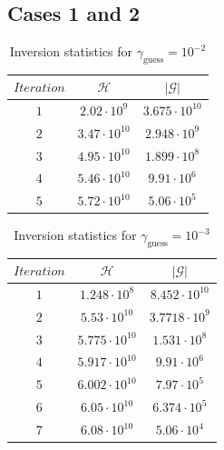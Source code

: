 \documentclass[12pt]{article}
\begin{document}
\subsection{Cases 1 and 2}
\begin{table}[H]
		\caption{Inversion statistics for $\gamma_{\text{guess}}= 10^{-2}$} %
		\centering  %
		\begin{tabular}{c c c } %
		\hline \hline                        %
 		$Iteration$&$\mathcal H$ &$|\mathcal G|$   \\ [0.5ex] %
		\hline                  %
                $1$&$2.02\cdot 10^{9}$&$3.675\cdot 10^{10}$   \\
		$2$&$3.47\cdot 10^{10}$&$2.948\cdot 10^{9}$   \\
                $3$&$4.95\cdot 10^{10}$&$1.899\cdot 10^{8}$   \\
		$4$&$5.46\cdot 10^{10}$&$9.91\cdot 10^{6}$   \\
		$5$&$5.72\cdot 10^{10}$&$5.06\cdot 10^{5}$   \\

                \hline %
		\end{tabular}
		\label{table:gradcheck1} %
		\end{table}
 

\begin{table}[H]
		\caption{Inversion statistics for $\gamma_{\text{guess}}= 10^{-3}$} %
		\centering  %
		\begin{tabular}{c c c } %
		\hline \hline                        %
 		$Iteration$&$\mathcal H$ &$|\mathcal G|$   \\ [0.5ex] %
		\hline                  %
                $1$&$1.248\cdot 10^{8}$&$8.452\cdot 10^{10}$   \\
		$2$&$5.53\cdot 10^{10}$&$3.7718\cdot 10^{9}$   \\
                $3$&$5.775\cdot 10^{10}$&$1.531\cdot 10^{8}$   \\
		$4$&$5.917\cdot 10^{10}$&$9.91\cdot 10^{6}$   \\
		$5$&$6.002\cdot 10^{10}$&$7.97\cdot 10^{5}$   \\
	        $6$&$6.05\cdot 10^{10}$&$6.374\cdot 10^{5}$   \\
        	$7$&$6.08\cdot 10^{10}$&$5.06\cdot 10^{4}$   \\
        
                \hline %
		\end{tabular}
		\label{table:gradcheck2} %
		\end{table}
\end{document}
